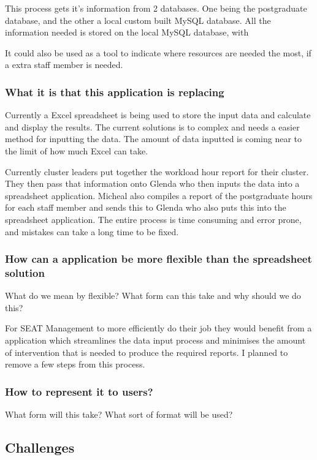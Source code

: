 \documentclass[11pt]{article}
\begin{document}
This process gets it's information from 2 databases.  One being the
postgraduate database, and the other a local custom built MySQL
database.  All the information needed is stored on the local MySQL
database, with 


It could also be used as a tool to indicate where resources are needed
the most, if a extra staff member is needed.
\subsubsection{What it is that this application is replacing}
\label{sec-2_1_1}

Currently a Excel spreadsheet is being used to store the input data
and calculate and display the results.  The current solutions is to
complex and needs a easier method for inputting the data.  The amount
of data inputted is coming near to the limit of how much Excel can
take.

Currently cluster leaders put together the workload hour report for
their cluster.  They then pass that information onto Glenda who then
inputs the data into a spreadsheet application.  Micheal also compiles
a report of the postgraduate hours for each staff member and sends
this to Glenda who also puts this into the spreadsheet application.
The entire process is time consuming and error prone, and mistakes
can take a long time to be fixed.
\subsubsection{How can a application be more flexible than the spreadsheet solution}
\label{sec-2_1_2}

What do we mean by flexible?  What form can this take and why should
we do this?

For SEAT Management to more efficiently do their job they would
benefit from a application which streamlines the data input process
and minimises the amount of intervention that is needed to produce the
required reports.  I planned to remove a few steps from this process.
\subsubsection{How to represent it to users?}
\label{sec-2_1_3}

What form will this take?  What sort of format will be used?
\subsection{Challenges}
\label{sec-2_2}
\end{document}
